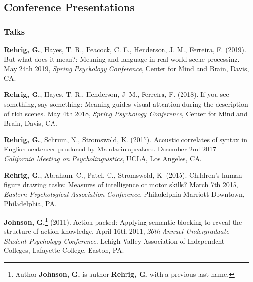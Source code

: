 

\subsection*{Conference Presentations}

\subsubsection*{Talks}

\textbf{Rehrig, G.}, Hayes, T. R., Peacock, C. E., Henderson, J. M., Ferreira, F. (2019). But what does it mean?: Meaning and language in real-world scene processing. May 24th 2019, \textit{Spring Psychology Conference}, Center for Mind and Brain, Davis, CA.


\textbf{Rehrig, G.}, Hayes, T. R., Henderson, J. M., Ferreira, F. (2018). If you see something, say something: Meaning guides visual attention during the description of rich scenes. May 4th 2018, \textit{Spring Psychology Conference}, Center for Mind and Brain, Davis, CA.


\textbf{Rehrig, G.}, Schrum, N., Stromswold, K. (2017). Acoustic correlates of syntax in English sentences produced by Mandarin speakers. December 2nd 2017, \textit{California Meeting on Psycholinguistics}, UCLA, Los Angeles, CA.



\textbf{Rehrig, G.}, Abraham, C., Patel, C., Stromswold, K. (2015). Children's human figure drawing tasks: Measures of intelligence or motor skills? March 7th 2015, \textit{Eastern Psychological Association Conference}, Philadelphia Marriott Downtown, Philadelphia, PA.



\textbf{Johnson, G.}\footnote{Author \textbf{Johnson, G.} is author \textbf{Rehrig, G.} with a previous last name.} (2011). Action packed: Applying semantic blocking to reveal the structure of action knowledge.  April 16th 2011, \textit{26th Annual Undergraduate Student Psychology Conference}, Lehigh Valley Association of Independent Colleges, Lafayette College, Easton, PA.

